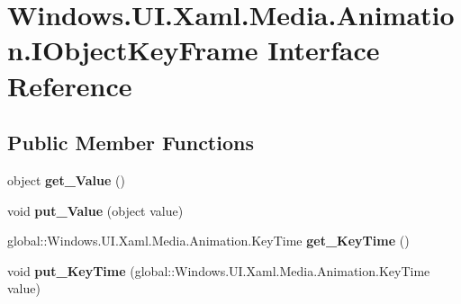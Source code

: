 \hypertarget{interface_windows_1_1_u_i_1_1_xaml_1_1_media_1_1_animation_1_1_i_object_key_frame}{}\section{Windows.\+U\+I.\+Xaml.\+Media.\+Animation.\+I\+Object\+Key\+Frame Interface Reference}
\label{interface_windows_1_1_u_i_1_1_xaml_1_1_media_1_1_animation_1_1_i_object_key_frame}
\subsection*{Public Member Functions}
\begin{DoxyCompactItemize}
\item 
\mbox{\label{interface_windows_1_1_u_i_1_1_xaml_1_1_media_1_1_animation_1_1_i_object_key_frame_a666644384dad0aa2681d1c72775e1946}} 
object {\bfseries get\+\_\+\+Value} ()
\item 
\mbox{\label{interface_windows_1_1_u_i_1_1_xaml_1_1_media_1_1_animation_1_1_i_object_key_frame_ace1eb8eee944c8ccea95a4b439ff3f27}} 
void {\bfseries put\+\_\+\+Value} (object value)
\item 
\mbox{\label{interface_windows_1_1_u_i_1_1_xaml_1_1_media_1_1_animation_1_1_i_object_key_frame_a5a5e7923940305c167ff4aeadbb918e1}} 
global\+::\+Windows.\+U\+I.\+Xaml.\+Media.\+Animation.\+Key\+Time {\bfseries get\+\_\+\+Key\+Time} ()
\item 
\mbox{\label{interface_windows_1_1_u_i_1_1_xaml_1_1_media_1_1_animation_1_1_i_object_key_frame_afad5ba469666b91faed8df55c0c7efca}} 
void {\bfseries put\+\_\+\+Key\+Time} (global\+::\+Windows.\+U\+I.\+Xaml.\+Media.\+Animation.\+Key\+Time value)
\item 
\mbox{\label{interface_windows_1_1_u_i_1_1_xaml_1_1_media_1_1_animation_1_1_i_object_key_frame_a666644384dad0aa2681d1c72775e1946}} 

\end{DoxyCompactItemize}
